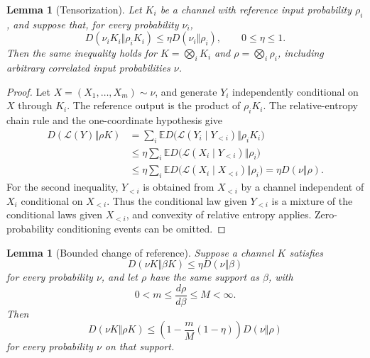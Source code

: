 \documentclass[11pt,reqno]{amsart}
\newtheorem{lemma}[theorem]{Lemma}
\theoremstyle{remark}
\newcommand{\E}{\mathbb E}
\newcommand{\Law}{\mathcal L}
\numberwithin{equation}{section}
\begin{document}
\begin{lemma}[Tensorization]\label{lem:tensor}
Let $K_i$ be a channel with reference input probability $\rho_i$, and suppose that, for every probability $\nu_i$,
\[
 D(\nu_iK_i\Vert\rho_iK_i)\le\eta D(\nu_i\Vert\rho_i),
 \qquad 0\le\eta\le1.
\]
Then the same inequality holds for $K=\bigotimes_iK_i$ and $\rho=\bigotimes_i\rho_i$, including arbitrary correlated input probabilities $\nu$.
\end{lemma}

\begin{proof}
Let $X=(X_1,\ldots,X_m)\sim\nu$, and generate $Y_i$ independently conditional on $X$ through $K_i$. The reference output is the product of $\rho_iK_i$. The relative-entropy chain rule and the one-coordinate hypothesis give
\begin{align*}
 D(\Law(Y)\Vert\rho K)
 &=\sum_i\E D\bigl(\Law(Y_i\mid Y_{<i})\Vert\rho_iK_i\bigr)\\
 &\le\eta\sum_i\E D\bigl(\Law(X_i\mid Y_{<i})\Vert\rho_i\bigr)\\
 &\le\eta\sum_i\E D\bigl(\Law(X_i\mid X_{<i})\Vert\rho_i\bigr)
 =\eta D(\nu\Vert\rho).
\end{align*}
For the second inequality, $Y_{<i}$ is obtained from $X_{<i}$ by a channel independent of $X_i$ conditional on $X_{<i}$. Thus the conditional law given $Y_{<i}$ is a mixture of the conditional laws given $X_{<i}$, and convexity of relative entropy applies. Zero-probability conditioning events can be omitted.
\end{proof}

\begin{lemma}[Bounded change of reference]\label{lem:perturb}
Suppose a channel $K$ satisfies
\[
 D(\nu K\Vert\beta K)\le\eta D(\nu\Vert\beta)
\]
for every probability $\nu$, and let $\rho$ have the same support as $\beta$, with
\[
 0<m\le\frac{d\rho}{d\beta}\le M<\infty.
\]
Then
\begin{equation}\label{eq:perturb}
 D(\nu K\Vert\rho K)
 \le\left(1-\frac mM(1-\eta)\right)D(\nu\Vert\rho)
\end{equation}
for every probability $\nu$ on that support.
\end{lemma}
\end{document}
